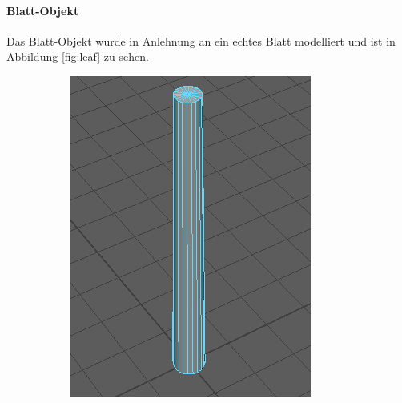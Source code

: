 \paragraph{Blatt-Objekt} Das Blatt-Objekt wurde in Anlehnung an ein echtes Blatt modelliert und ist in Abbildung \ref{fig:leaf} zu sehen.\\

\setlength{\fwidth}{.3\textwidth}
\begin{figure}[htb]
  \centering
  \begin{subfigure}[b]{\fwidth}
   \includegraphics[width=\textwidth]{figures/edge}
    \label{fig:edge}
  \end{subfigure}
  \hspace{.5 cm}
  \begin{subfigure}[b]{\fwidth}

\end{subfigure}
\end{figure}
